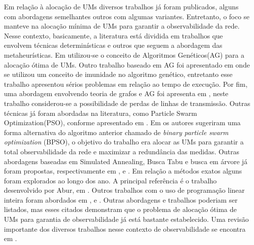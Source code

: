 \documentclass[12pt]{article}
\begin{document}
Em relação à alocação de UMs diversos trabalhos já foram publicados, alguns com abordagens semelhantes outros com algumas variantes. Entretanto, o foco se manteve na alocação mínima de UMs para garantir a observabilidade da rede. Nesse contexto, basicamente, a literatura está dividida em trabalhos que envolvem técnicas determinísticas e outros que seguem a abordagem das metaheurísticas. Em \cite{Marin03} utilizou-se o conceito de Algoritmos Genéticos(AG) para a alocação ótima de UMs. Outro trabalho baseado em AG foi apresentado em \cite{Aminifar09} onde se utilizou um conceito de imunidade no algoritmo genético, entretanto esse trabalho apresentou sérios problemas em relação ao tempo de execução. Por fim, uma abordagem  envolvendo teoria de grafos e AG foi apresenta em \cite{Milosev03}, neste trabalho considerou-se a possibilidade de perdas de linhas de transmissão. Outras técnicas já foram abordadas na literatura, como Particle Swarm Optimization(PSO), conforme apresentado em \cite{PSO}. Em \cite{BPSO} os autores sugeriram uma forma alternativa do algoritmo anterior chamado de \textit{binary particle swarm optimization} (BPSO), o objetivo do trabalho era alocar as UMs para garantir a total observabilidade da rede e maximizar a redundância das medidas. Outras abordagens baseadas em Simulated Annealing,  Busca Tabu e busca em árvore já foram propostas, respectivamente em \cite{SA}, \cite{TS} e \cite{Tree}. Em relação a métodos exatos alguns foram explorados ao longo dos ano. A principal referência é o trabalho desenvolvido por Abur, em \cite{Abur04_opt}. Outros trabalhos com o uso de programação linear inteira foram abordados em \cite{Amin10},\cite{Gou08_1} e \cite{Gou08_2}. Outras abordagens e trabalhos poderiam ser listados, mas esses citados demonstram que o problema de alocação ótima de UMs para garantia de observabilidade já está bastante estabelecido. Uma revisão importante dos diversos trabalhos nesse contexto de observabilidade se encontra em \cite{ReviewAlloc}.
\end{document}

